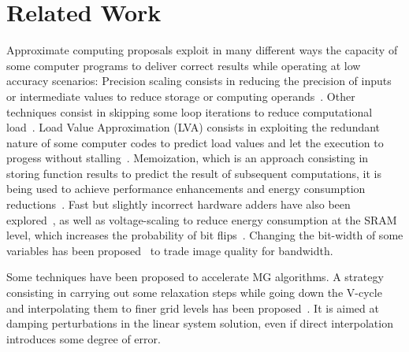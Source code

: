 \section{Related Work}
\label{sec:related}

Approximate computing proposals exploit in many different ways the capacity of some computer programs to deliver correct results while operating at low accuracy scenarios: 
Precision scaling consists in reducing the precision of inputs or intermediate values to reduce storage or computing operands~\cite{Yeh2007, Tian2015}. 
Other techniques consist in skipping some loop iterations to reduce computational load~\cite{Sidiroglou2011}.
Load Value Approximation (LVA) consists in exploiting the redundant nature of some computer codes to predict load values and let the execution to progess without stalling~\cite{Miguel2014}.
Memoization, which is an approach consisting in storing function results to predict the result of subsequent computations, it is being used to achieve performance enhancements and energy consumption reductions~\cite{Alvarez2005, Brumar2017}.  
Fast but slightly incorrect hardware adders have also been explored~\cite{Gupta:2011}, as well as voltage-scaling to reduce energy consumption at the SRAM level, which increases the probability of bit flips~\cite{Sampson:2011}. 
Changing the bit-width of some variables has been proposed~\cite{Park:2010} to trade image quality for bandwidth.

Some techniques have been proposed to accelerate MG algorithms. 
A strategy consisting in   
carrying out some relaxation steps while going down the V-cycle and interpolating them to finer grid levels has been proposed~\cite{JAMESON}.
It is aimed at damping perturbations in the linear system solution, even if direct interpolation introduces some degree of error.


